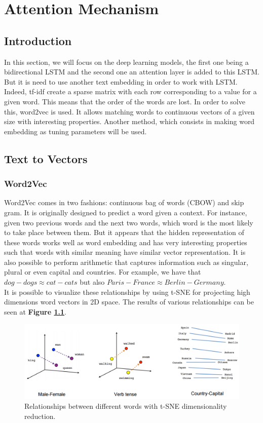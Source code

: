 ﻿\chapter{Attention Mechanism}
\section{Introduction}
In this section, we will focus on the deep learning models, the first one being a bidirectional LSTM and the second one an attention layer is added to this LSTM. But it is need to use another text embedding in order to work with LSTM. Indeed, tf-idf create a sparse matrix with each row corresponding to a value for a given word. This means that the order of the words are lost. In order to solve this, word2vec\cite{Mikolov2013} is used. It allows matching words to continuous vectors of a given size with interesting properties. Another method, which consists in making word embedding as tuning parameters will be used.
\section{Text to Vectors}
\subsection{Word2Vec}
Word2Vec comes in two fashions: continuous bag of words (CBOW) and skip gram. It is originally designed to predict a word given a context. For instance, given two previous words and the next two words, which word is the most likely to take place between them. But it appears that the hidden representation of these words works well as word embedding and has very interesting properties such that words with similar meaning have similar vector representation. It is also possible to perform arithmetic that captures information such as singular, plural or even capital and countries. For example, we have that $dog - dogs \approx cat - cats$ but also $Paris - France \approx Berlin - Germany$. \\
It is possible to visualize these relationships by using t-SNE for projecting high dimensions word vectors in 2D space. The results of various relationships can be seen at \textbf{Figure \ref{fig:chap4:word2vec}}.
\begin{figure}
 \centering
 \includegraphics[width=\textwidth]{images/chapitre4/linear-relationships}
 \caption{Relationships between different words with t-SNE dimensionality reduction. }
 \label{fig:chap4:word2vec}
\end{figure}
